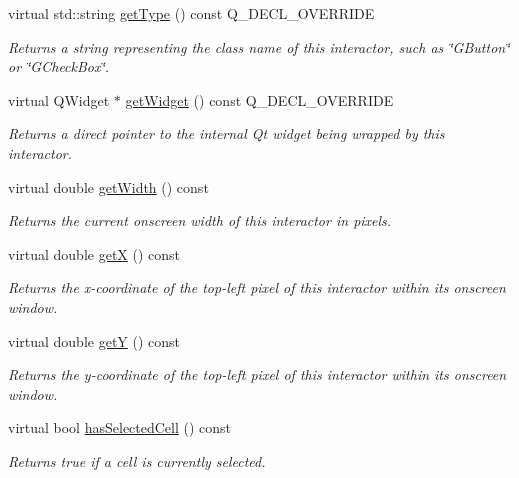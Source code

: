 \begin{DoxyCompactItemize}
virtual std\+::string \mbox{\hyperlink{classGTable_a9896d58fcfebbf1025aeeb5b8b9ede80}{get\+Type}} () const Q\+\_\+\+D\+E\+C\+L\+\_\+\+O\+V\+E\+R\+R\+I\+DE
\begin{DoxyCompactList}\small\item\em Returns a string representing the class name of this interactor, such as \char`\"{}\+G\+Button\char`\"{} or \char`\"{}\+G\+Check\+Box\char`\"{}. \end{DoxyCompactList}\item 
virtual Q\+Widget $\ast$ \mbox{\hyperlink{classGTable_a326ee51b5561f807df7b29a1c101f7fd}{get\+Widget}} () const Q\+\_\+\+D\+E\+C\+L\+\_\+\+O\+V\+E\+R\+R\+I\+DE
\begin{DoxyCompactList}\small\item\em Returns a direct pointer to the internal Qt widget being wrapped by this interactor. \end{DoxyCompactList}\item 
virtual double \mbox{\hyperlink{classGInteractor_a0ed2965abd4f5701d2cadf71239faf19}{get\+Width}} () const
\begin{DoxyCompactList}\small\item\em Returns the current onscreen width of this interactor in pixels. \end{DoxyCompactList}\item 
virtual double \mbox{\hyperlink{classGInteractor_a344385751bee0720059403940d57a13e}{getX}} () const
\begin{DoxyCompactList}\small\item\em Returns the x-\/coordinate of the top-\/left pixel of this interactor within its onscreen window. \end{DoxyCompactList}\item 
virtual double \mbox{\hyperlink{classGInteractor_aafa51c7f8f38a09febbb9ce7853f77b4}{getY}} () const
\begin{DoxyCompactList}\small\item\em Returns the y-\/coordinate of the top-\/left pixel of this interactor within its onscreen window. \end{DoxyCompactList}\item 
virtual bool \mbox{\hyperlink{classGTable_a4a1007a3d14cd35f0bd514cc0b29886b}{has\+Selected\+Cell}} () const
\begin{DoxyCompactList}\small\item\em Returns true if a cell is currently selected. \end{DoxyCompactList}\item 

\end{DoxyCompactItemize}
